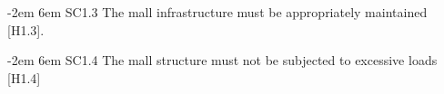 \documentclass[12pt]{article}
\begin{document}
{\parindent -2em
\leftskip 6em
SC1.3 The mall infrastructure must be appropriately maintained [H1.3].

}

{\parindent -2em
\leftskip 6em
SC1.4 The mall structure must not be subjected to excessive loads [H1.4]

}






















\end{document}
